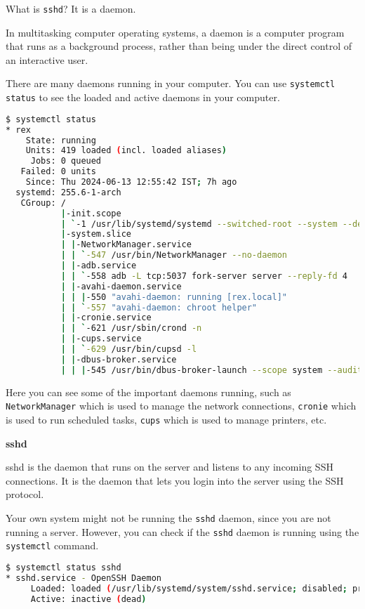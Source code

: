What is \texttt{sshd}?
It is a daemon.

\begin{definition}[Daemon]
  In multitasking computer operating systems, a daemon
  is a computer program that runs as a background process,
  rather than being under the direct control of an
  interactive user.
\end{definition}

There are many daemons running in your computer.
You can use \texttt{systemctl status} to see the
loaded and active daemons in your computer.

\begin{lstlisting}[language=bash]
$ systemctl status
* rex
    State: running
    Units: 419 loaded (incl. loaded aliases)
     Jobs: 0 queued
   Failed: 0 units
    Since: Thu 2024-06-13 12:55:42 IST; 7h ago
  systemd: 255.6-1-arch
   CGroup: /
           |-init.scope
           | `-1 /usr/lib/systemd/systemd --switched-root --system --deserialize=43
           |-system.slice
           | |-NetworkManager.service
           | | `-547 /usr/bin/NetworkManager --no-daemon
           | |-adb.service
           | | `-558 adb -L tcp:5037 fork-server server --reply-fd 4
           | |-avahi-daemon.service
           | | |-550 "avahi-daemon: running [rex.local]"
           | | `-557 "avahi-daemon: chroot helper"
           | |-cronie.service
           | | `-621 /usr/sbin/crond -n
           | |-cups.service
           | | `-629 /usr/bin/cupsd -l
           | |-dbus-broker.service
           | | |-545 /usr/bin/dbus-broker-launch --scope system --audit
\end{lstlisting}

Here you can see some of the important daemons running,
such as \texttt{NetworkManager} which is used to manage
the network connections, \texttt{cronie} which is used
to run scheduled tasks, \texttt{cups} which is used to
manage printers, etc.

\textbf{sshd}

sshd is the daemon that runs on the server and listens
to any incoming SSH connections. It is the daemon that
lets you login into the server using the SSH protocol.

Your own system might not be running the \texttt{sshd}
daemon, since you are not running a server. However,
you can check if the \texttt{sshd} daemon is running
using the \texttt{systemctl} command.

\begin{lstlisting}[language=bash]
$ systemctl status sshd
* sshd.service - OpenSSH Daemon
     Loaded: loaded (/usr/lib/systemd/system/sshd.service; disabled; preset: disabled)
     Active: inactive (dead)
\end{lstlisting}

